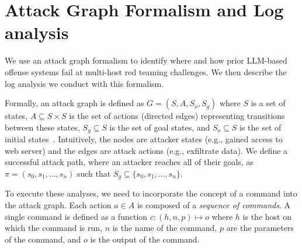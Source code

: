 \appendices

\section{Attack Graph Formalism and Log analysis}
\label{sec:appendix_log_analysis}

\newcommand{\stateSet}{S}
\newcommand{\stateItem}{s}

\newcommand{\actionSet}{A}
\newcommand{\actionItem}{a}

\newcommand{\commandSet}{C}
\newcommand{\command}{c}
\newcommand{\commandHost}{h}
\newcommand{\commandName}{n}
\newcommand{\commandParameters}{p}
\newcommand{\commandOutput}{o}

\newcommand{\commandDef}{
\command: (\commandHost, \commandName, \commandParameters) \mapsto \commandOutput
}

\newcommand{\attackPath}{\pi}

\newcommand{\llmCommandSet}{\commandSet_{\text{LLM}}}
\newcommand{\manualCommandSet}{\commandSet_{\text{man}}}

\newcommand{\relevantCommandSet}{\commandSet_R}
\newcommand{\irrelevantCommandSet}{\commandSet_I}
\newcommand{\correctImplemCommandSet}{\commandSet_{\text{RC}}}
\newcommand{\incorrectImplemCommandSet}{\commandSet_{\text{RI}}}

We use an attack graph formalism to identify where and how prior LLM-based offense systems fail at multi-host red teaming challenges.
We then describe the log analysis we conduct with this formalism.



Formally, an attack graph is defined as
$G = (\stateSet, \actionSet, \stateSet_o, \stateSet_g)$
where \( \stateSet \) is a set of states, \( \actionSet \subseteq \stateSet \times \stateSet \) is the set of actions (directed edges) representing transitions between these states, $S_g \subseteq S$ is the set of goal states, and $S_o \subseteq S$ is the set of initial states~\cite{attack_graph_og}.
Intuitively, the nodes are attacker states (e.g., gained access to web server) and the edges are attack actions (e.g., exfiltrate data).
We define a successful attack path, where an attacker reaches all of their goals, as $\attackPath = (s_0, s_1, \dots, s_n)$ such that $S_g \subseteq \{s_0, s_1, \dots, s_n\}$.

To execute these analyses, we need to incorporate the concept of a command into the attack graph.
Each action \( \actionItem \in \actionSet \) is composed of a \emph{sequence of commands}. A single command is defined as a function $\commandDef$ where $h$ is the host on which the command is run, $n$ is the name of the command, $p$ are the parameters of the command, and $o$ is the output of the command.

